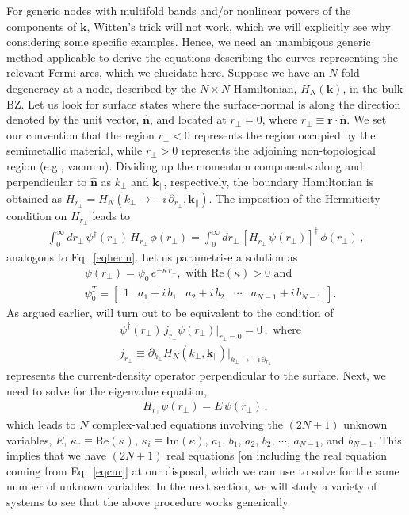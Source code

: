 \documentclass[aps,prl,twocolumn,nofootinbib,showkeys, nolongbibliography, 10pt]{revtex4-2}
\def \nn{\nonumber \\}
\begin{document}
For generic nodes with multifold bands and/or nonlinear powers of the components of $\mathbf k$, Witten's trick will not work, which we will explicitly see why considering some specific examples. Hence, we need an unambigous generic method applicable to derive the equations describing the curves representing the relevant Fermi arcs, which we elucidate here. Suppose we have an $N$-fold degeneracy at a node, described by the $N \times N $ Hamiltonian, $H_N (\mathbf k)$, in the bulk BZ. Let us look for surface states where the surface-normal is along the direction denoted by the unit vector, $\boldsymbol{\hat n}$, and located at $r_\perp = 0$, where $ r_\perp \equiv \mathbf r \cdot \boldsymbol{\hat n}$. We set our convention that the region $ r_\perp <0 $ represents the region occupied by the semimetallic material, while $r_\perp >0 $ represents the adjoining non-topological region (e.g., vacuum). Dividing up the momentum components along and perpendicular to $\boldsymbol{\hat n}$ as $  k_\perp$ and $\mathbf k_\parallel $, respectively, the boundary Hamiltonian is obtained as
$ H_{r_\perp} = H_N ( k_\perp\rightarrow -i \, \partial_{r_\perp} , \mathbf k_\parallel)$.
The imposition of the Hermiticity condition on $H_{r_\perp}$ leads to
\begin{align}
\label{eqherm1}
 \int_0^\infty  dr_\perp \,\psi^\dagger (r_\perp) \, H_{r_\perp}\,\phi (r_\perp) = 
 \int_0^\infty  dr_\perp\, [ H_{r_\perp}\, \psi(r_\perp) ]^\dagger\,\phi(r_\perp) \,,
\end{align}
analogous to Eq.~\eqref{eqherm}. Let us parametrise a solution as
\begin{align}
& \psi (r_\perp) = \psi_0 \, e^{- \kappa \, r_\perp} ,
\text{ with } \text{Re}(\kappa) > 0
\text{ and} \nn
& \psi_0^T  = \begin{bmatrix}
1 & a_1 +i \, b_1 & a_2 + i \, b_2 & \cdots & a_{N-1} + i \, b_{N-1}
\end{bmatrix}.
\end{align}
As argued earlier, will turn out to be equivalent to the condition of
\begin{align}
\label{eqcur}
&\psi^\dagger  (r_\perp)\, j_{r_\perp} \psi (r_\perp) \big \vert_{r_\perp=0}= 0\,,
 \text{ where} \nn &
 j_{r_\perp} \equiv \partial_{k_\perp}  H_N(k_\perp,  {\mathbf k_\parallel} ) 
\big \vert_{k_\perp \rightarrow -i\, \partial_{r_\perp} }
\end{align}
represents the current-density operator perpendicular to the surface. Next, we need to solve for the eigenvalue equation,
\begin{align}
\label{eqhambdy}
H_{r_\perp} \psi (r_\perp) = E\, \psi (r_\perp)\,,
\end{align}
which leads to $N$ complex-valued equations involving the $(2N+1)$ unknown variables, $ E$,
$\kappa_r \equiv \text{Re}(\kappa)$, $\kappa_i \equiv \text{Im}(\kappa)$, $a_1$, $ b_1$, $a_2$, $ b_2$, $\cdots$, $a_{N-1}$,
and $b_{N-1}$. This implies that we have $(2N+1)$ real equations [on including the real equation coming from Eq.~\eqref{eqcur}] at our disposal, which we can use to solve for the same number of unknown variables. In the next section, we will study a variety of systems to see that the above procedure works generically.
\end{document}
